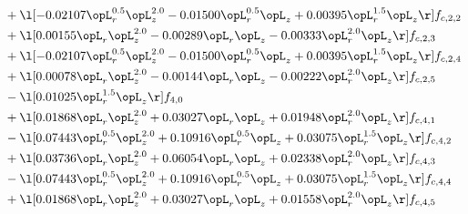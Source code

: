\begin{alignat}{2}
& + \l[  -0.02107 \opL_r^{0.5} \opL_z^{2.0}   -0.01500 \opL_r^{0.5} \opL_z +  0.00395 \opL_r^{1.5} \opL_z  \r] f_{c,2,2} \nonumber \\ 
& + \l[  0.00155 \opL_r \opL_z^{2.0}   -0.00289 \opL_r \opL_z   -0.00333 \opL_r^{2.0} \opL_z  \r] f_{c,2,3} \nonumber \\ 
& + \l[  -0.02107 \opL_r^{0.5} \opL_z^{2.0}   -0.01500 \opL_r^{0.5} \opL_z +  0.00395 \opL_r^{1.5} \opL_z  \r] f_{c,2,4} \nonumber \\ 
& + \l[  0.00078 \opL_r \opL_z^{2.0}   -0.00144 \opL_r \opL_z   -0.00222 \opL_r^{2.0} \opL_z  \r] f_{c,2,5} \nonumber \\ 
& - \l[  0.01025 \opL_r^{1.5} \opL_z  \r] f_{4,0} \nonumber \\ 
& + \l[  0.01868 \opL_r \opL_z^{2.0} +  0.03027 \opL_r \opL_z +  0.01948 \opL_r^{2.0} \opL_z  \r] f_{c,4,1} \nonumber \\ 
& - \l[  0.07443 \opL_r^{0.5} \opL_z^{2.0} +  0.10916 \opL_r^{0.5} \opL_z +  0.03075 \opL_r^{1.5} \opL_z  \r] f_{c,4,2} \nonumber \\ 
& + \l[  0.03736 \opL_r \opL_z^{2.0} +  0.06054 \opL_r \opL_z +  0.02338 \opL_r^{2.0} \opL_z  \r] f_{c,4,3} \nonumber \\ 
& - \l[  0.07443 \opL_r^{0.5} \opL_z^{2.0} +  0.10916 \opL_r^{0.5} \opL_z +  0.03075 \opL_r^{1.5} \opL_z  \r] f_{c,4,4} \nonumber \\ 
& + \l[  0.01868 \opL_r \opL_z^{2.0} +  0.03027 \opL_r \opL_z +  0.01558 \opL_r^{2.0} \opL_z  \r] f_{c,4,5} \nonumber \\ 
\end{alignat} 


